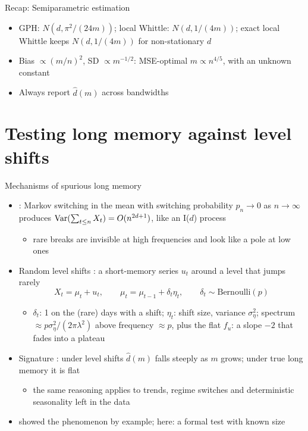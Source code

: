\begin{frame}{Recap: Semiparametric estimation}
\itemsize{\small}
\begin{itemize}
    \item GPH: $N(d, \pi^2/(24m))$; local Whittle: $N(d, 1/(4m))$; exact local Whittle keeps $N(d, 1/(4m))$ for non-stationary $d$
    \item Bias $\propto (m/n)^2$, SD $\propto m^{-1/2}$: MSE-optimal $m \propto n^{4/5}$, with an unknown constant
    \item Always report $\hat d(m)$ across bandwidths
\end{itemize}
\end{frame}


\section{Testing long memory against level shifts}

\begin{frame}{Mechanisms of spurious long memory}
\itemsize{\small}
\begin{itemize}
    \item {}: Markov switching in the mean with switching probability $p_n \to 0$ as $n \to \infty$ produces $\text{Var}(\sum_{t\le n}X_t) = O(n^{2d+1})$, like an I($d$) process
    \begin{itemize}
        \item rare breaks are invisible at high frequencies and look like a pole at low ones 
    \end{itemize}
    \item Random level shifts : a short-memory series $u_t$ around a level that jumps rarely
    \[ X_t = \mu_t + u_t, \qquad \mu_t = \mu_{t-1} + \delta_t\eta_t, \qquad \delta_t \sim \mathrm{Bernoulli}(p) \]
    \begin{itemize}
        \item $\delta_t$: 1 on the (rare) days with a shift; $\eta_t$: shift size, variance $\sigma^2_\eta$; spectrum $\approx p\sigma_\eta^2/(2\pi\lambda^2)$ above frequency $\approx p$, plus the flat $f_u$: a slope $-2$ that fades into a plateau
    \end{itemize}
    \item Signature : under level shifts $\hat d(m)$ falls steeply as $m$ grows; under true long memory it is flat
    \begin{itemize}
        \item the same reasoning applies to trends, regime switches and deterministic seasonality left in the data
    \end{itemize}
    \item {} showed the phenomenon by example; here: a formal test with known size
\end{itemize}
\end{frame}

